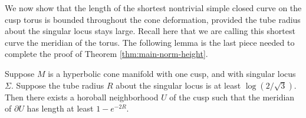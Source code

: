 We now show that the length of the shortest nontrivial simple closed
curve on the cusp torus is bounded throughout the cone deformation,
provided the tube radius about the singular locus stays large.  Recall
here that we are calling this shortest curve the meridian of the
torus.  The following lemma is the last piece needed to complete the
proof of Theorem \ref{thm:main-norm-height}.

\begin{lemma}
Suppose $M$ is a hyperbolic cone manifold with one cusp, and with
singular locus $\Sigma$.  Suppose the tube radius $R$ about the
singular locus is at least $\log(2/\sqrt{3})$.  Then there exists a
horoball neighborhood $U$ of the cusp such that the meridian of
$\partial U$ has length at least $1-e^{-2R}$.
  \label{lemma:meridian-bound}
\end{lemma}

